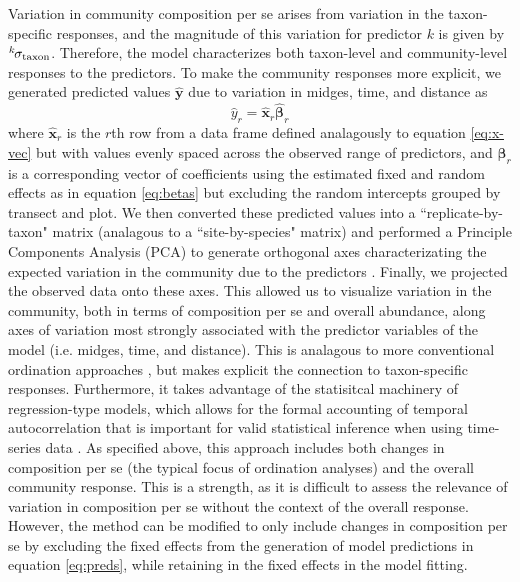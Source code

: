 Variation in community composition per se arises from variation in the taxon-specific
responses, and the magnitude of this
variation for predictor $k$ is given by ${}^k\hspace*{-1pt}\sigma_\text{taxon}$.
Therefore, the model characterizes both
taxon-level and community-level responses to the predictors.
To make the community responses more explicit, we generated predicted values
$\hat{\mathbf{y}}$ due to variation in midges, time, and distance as
%
\begin{equation} \label{eq:preds}
    \hat{y}_r = \hat{\mathbf{x}}_r \hat{{\boldsymbol\beta}}_r
\end{equation}
%
\noindent where $\hat{\mathbf{x}}_r$ is the $r$th row from a data frame defined
analagously to equation \ref{eq:x-vec} but with values evenly spaced across the
observed range of predictors, and $\hat{{\boldsymbol\beta}}_r$ is a
corresponding vector of coefficients using the estimated fixed and random effects
as in equation \ref{eq:betas} but excluding the random intercepts grouped
by transect and plot. We then converted these predicted values into a
``replicate-by-taxon" matrix (analagous to a ``site-by-species" matrix)
and performed a Principle Components Analysis (PCA) to
generate orthogonal axes characterizating the expected
variation in the community due to the predictors \citep[similar to][]{Jackson2012}.
Finally, we projected the observed data onto these axes.
This allowed us to visualize variation in the community, both in terms of
composition per se and overall abundance, along axes of variation most
strongly associated with the predictor variables of the model
(i.e. midges, time, and distance).
This is analagous to more conventional ordination approaches \citep{Mcgarigal2013},
but makes explicit the connection to taxon-specific responses.
Furthermore, it takes advantage  of the statisitcal machinery of
regression-type models, which allows for the formal accounting of temporal
autocorrelation that is important for valid statistical inference when using
time-series data \citep{Ives2006}.
As specified above, this approach includes both changes in composition per se
(the typical focus of ordination analyses) and the overall community response.
This is a strength, as it is difficult to assess the relevance of variation in
composition per se without the context of the overall response.
However, the method can be modified to only include changes in composition
per se by excluding the fixed effects from the generation of model predictions
in equation \ref{eq:preds}, while retaining in the fixed effects in the model fitting.

